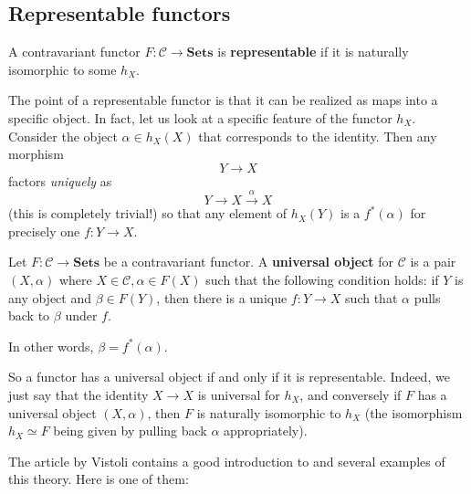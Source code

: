 \begin{theorem}
\end{theorem}

\subsection{Representable functors}

\begin{definition}
A contravariant functor $F: \mathcal{C} \to \mathbf{Sets}$ is
\textbf{representable} if it is naturally isomorphic to some $h_X$.
\end{definition}

The point of a representable functor is that it can be realized as maps into a
specific object.
In fact, let us look at a specific feature of the functor $h_X$.
Consider the object $\alpha \in h_X(X)$ that corresponds to the identity.
Then any morphism
\[ Y \to X  \]
factors \emph{uniquely}
as \[ Y \to X \stackrel{\alpha}{\to } X  \]
(this is completely trivial!) so that
any element of $h_X(Y)$ is a $f^*(\alpha)$ for precisely one $f:  Y \to X$.

\begin{definition}
Let $F: \mathcal{C} \to \mathbf{Sets}$ be a contravariant functor. A
\textbf{universal object} for $\mathcal{C}$ is a pair $(X, \alpha)$ where $X
\in \mathcal{C}, \alpha \in F(X)$ such that the following condition holds:
if $Y$ is any object and $\beta \in F(Y)$, then there is a unique $f: Y \to X$
such that $\alpha$ pulls back to $\beta$ under $f$.

In other words, $\beta = f^*(\alpha)$.
\end{definition}

So a functor has a universal object if and only if it is representable.
Indeed, we just say that the identity $X \to X$ is universal for $h_X$, and
conversely if $F$ has a universal object $(X, \alpha)$, then $F$ is naturally
isomorphic to $h_X$ (the isomorphism $h_X \simeq F$ being given by pulling
back $\alpha$ appropriately).


The article \cite{Vi08} by Vistoli contains a good introduction to and several
examples of this theory.
Here is one of them:

